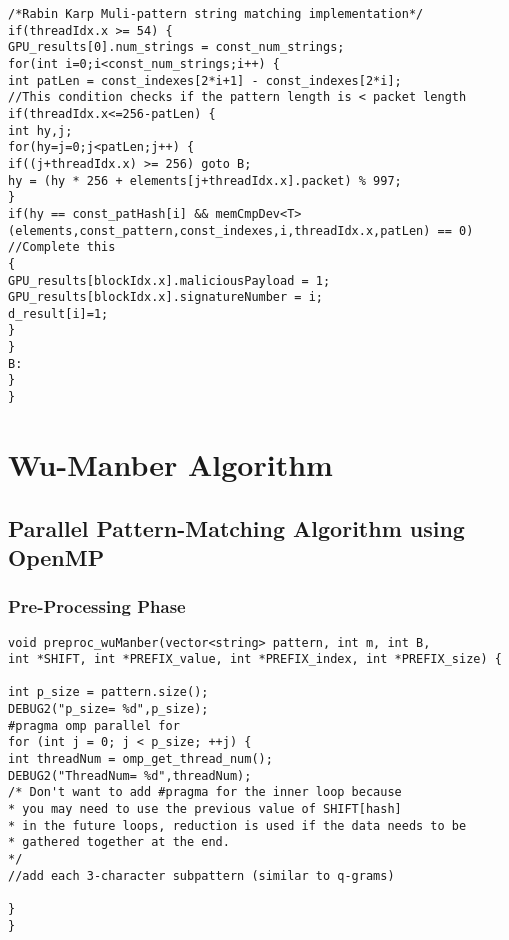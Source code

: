 \begin{lstlisting}
/*Rabin Karp Muli-pattern string matching implementation*/
if(threadIdx.x >= 54) {
GPU_results[0].num_strings = const_num_strings;
for(int i=0;i<const_num_strings;i++) {
int patLen = const_indexes[2*i+1] - const_indexes[2*i];
//This condition checks if the pattern length is < packet length
if(threadIdx.x<=256-patLen) {
int hy,j;
for(hy=j=0;j<patLen;j++) {
if((j+threadIdx.x) >= 256) goto B;
hy = (hy * 256 + elements[j+threadIdx.x].packet) % 997;
}
if(hy == const_patHash[i] && memCmpDev<T>(elements,const_pattern,const_indexes,i,threadIdx.x,patLen) == 0) //Complete this 
{
GPU_results[blockIdx.x].maliciousPayload = 1;
GPU_results[blockIdx.x].signatureNumber = i; 
d_result[i]=1;
} 
}
B:
} 
}
\end{lstlisting}
\vspace{\topsep}
\section{Wu-Manber Algorithm}
\vspace{\topsep}
\subsection{Parallel Pattern-Matching Algorithm using OpenMP}
\vspace{\topsep}
\subsubsection{Pre-Processing Phase}
\begin{lstlisting}
void preproc_wuManber(vector<string> pattern, int m, int B,
int *SHIFT, int *PREFIX_value, int *PREFIX_index, int *PREFIX_size) {

int p_size = pattern.size();
DEBUG2("p_size= %d",p_size);
#pragma omp parallel for
for (int j = 0; j < p_size; ++j) {
int threadNum = omp_get_thread_num();
DEBUG2("ThreadNum= %d",threadNum);
/* Don't want to add #pragma for the inner loop because
* you may need to use the previous value of SHIFT[hash]
* in the future loops, reduction is used if the data needs to be
* gathered together at the end.
*/
//add each 3-character subpattern (similar to q-grams)

}
}
\end{lstlisting}
\vspace{\topsep}
